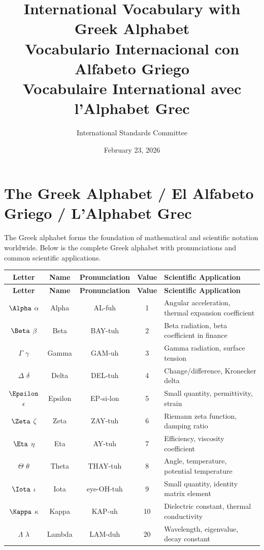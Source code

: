 \documentclass[12pt]{article}
\title{International Vocabulary with Greek Alphabet\\Vocabulario Internacional con Alfabeto Griego\\Vocabulaire International avec l'Alphabet Grec}
\author{International Standards Committee}
\date{February 23, 2026}
\begin{document}
\maketitle

\section{The Greek Alphabet / El Alfabeto Griego / L'Alphabet Grec}

The Greek alphabet forms the foundation of mathematical and scientific notation worldwide. Below is the complete Greek alphabet with pronunciations and common scientific applications.

\begin{longtable}{|c|c|c|c|p{5cm}|}
\hline
\textbf{Letter} & \textbf{Name} & \textbf{Pronunciation} & \textbf{Value} & \textbf{Scientific Application} \\
\hline
\endfirsthead
\hline
\textbf{Letter} & \textbf{Name} & \textbf{Pronunciation} & \textbf{Value} & \textbf{Scientific Application} \\
\hline
\endhead
\hline
\endfoot
\hline
\endlastfoot
$\Alpha$ $\alpha$ & Alpha & AL-fuh & 1 & Angular acceleration, thermal expansion coefficient \\
\hline
$\Beta$ $\beta$ & Beta & BAY-tuh & 2 & Beta radiation, beta coefficient in finance \\
\hline
$\Gamma$ $\gamma$ & Gamma & GAM-uh & 3 & Gamma radiation, surface tension \\
\hline
$\Delta$ $\delta$ & Delta & DEL-tuh & 4 & Change/difference, Kronecker delta \\
\hline
$\Epsilon$ $\epsilon$ & Epsilon & EP-si-lon & 5 & Small quantity, permittivity, strain \\
\hline
$\Zeta$ $\zeta$ & Zeta & ZAY-tuh & 6 & Riemann zeta function, damping ratio \\
\hline
$\Eta$ $\eta$ & Eta & AY-tuh & 7 & Efficiency, viscosity coefficient \\
\hline
$\Theta$ $\theta$ & Theta & THAY-tuh & 8 & Angle, temperature, potential temperature \\
\hline
$\Iota$ $\iota$ & Iota & eye-OH-tuh & 9 & Small quantity, identity matrix element \\
\hline
$\Kappa$ $\kappa$ & Kappa & KAP-uh & 10 & Dielectric constant, thermal conductivity \\
\hline
$\Lambda$ $\lambda$ & Lambda & LAM-duh & 20 & Wavelength, eigenvalue, decay constant \\

\end{longtable}
\end{document}
